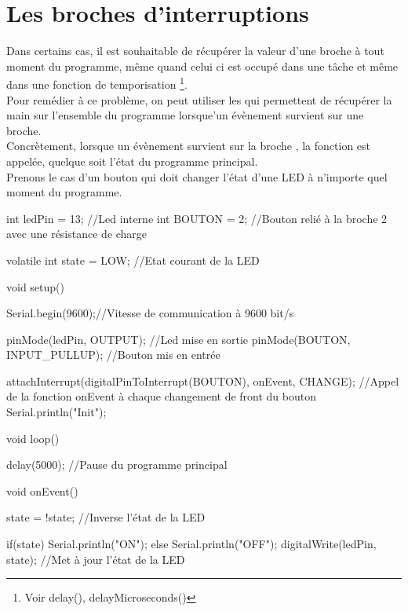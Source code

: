 
 \chapter{Les broches d'interruptions}

 Dans certains cas, il est souhaitable de récupérer la valeur d'une broche à tout moment du programme, même quand celui ci est occupé dans une tâche et même dans une fonction de temporisation \footnote{Voir delay(), delayMicroseconds()}. \\
 
 Pour remédier à ce problème, on peut utiliser les  qui permettent de récupérer la main sur l'ensemble du programme lorsque'un évènement survient sur une broche.\\
 
 Concrètement, lorsque un évènement   survient sur la broche , la fonction  est appelée, quelque soit l'état du programme principal. \\
 
 Prenons le cas d'un bouton qui doit changer l'état d'une LED à n'importe quel moment du programme.
 
 
\begin{Cpp}
 
     int ledPin = 13;    //Led interne
     int BOUTON = 2;  //Bouton relié à la broche 2 avec une résistance de charge
     
     volatile int state = LOW;  //Etat courant de la LED
     
     void setup() {
       
       Serial.begin(9600);//Vitesse de communication à 9600 bit/s
       
       pinMode(ledPin, OUTPUT);                //Led mise en sortie
       pinMode(BOUTON, INPUT_PULLUP);    //Bouton mis en entrée
       
       attachInterrupt(digitalPinToInterrupt(BOUTON), onEvent, CHANGE);  //Appel de la fonction onEvent à chaque changement de front du bouton
       Serial.println("Init");
     }
     
     void loop() {
       
      delay(5000); //Pause du programme principal
       
     }
     
     void onEvent() {
       
       state = !state; //Inverse l'état de la LED
       
       if(state){
         Serial.println("ON");
       }else{
         Serial.println("OFF");
       }
        digitalWrite(ledPin, state); //Met à jour l'état de la LED
     }
     
\end{Cpp}
 
